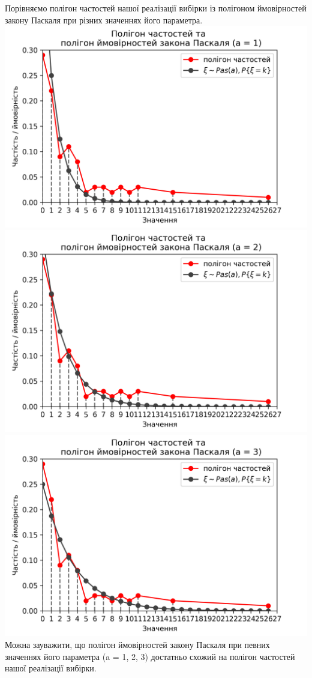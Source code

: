 \documentclass{article}
\begin{document}
Порівняємо полігон частостей нашої реалізації 
вибірки із полігоном ймовірностей закону Паскаля при 
різних значеннях його параметра.
\newline
\includegraphics[scale = 0.8]{pol+pas1}
\newline
\includegraphics[scale = 0.8]{pol+pas2}
\newline
\includegraphics[scale = 0.8]{pol+pas3}
\newline
Можна зауважити, що полігон ймовірностей закону Паскаля
при певних значеннях його параметра (a = 1, 2, 3) 
достатньо схожий на полігон частостей нашої реалізації вибірки.
\newpage
\end{document}
